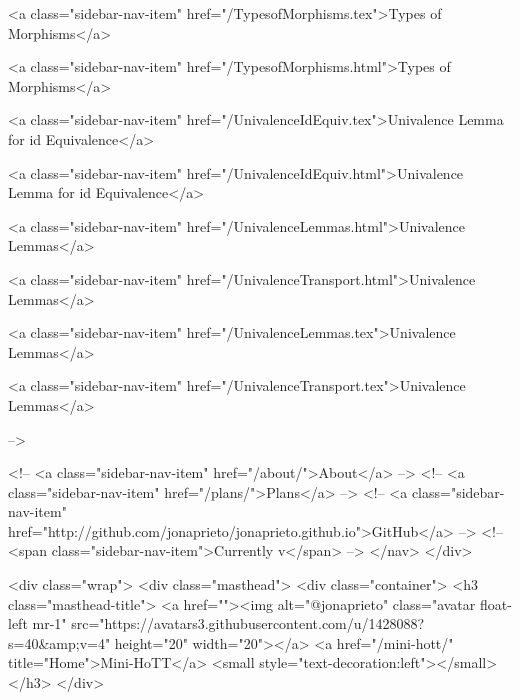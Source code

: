       
    
      
        
          <a class="sidebar-nav-item" href="/TypesofMorphisms.tex">Types of Morphisms</a>
        
      
    
      
        
          <a class="sidebar-nav-item" href="/TypesofMorphisms.html">Types of Morphisms</a>
        
      
    
      
        
          <a class="sidebar-nav-item" href="/UnivalenceIdEquiv.tex">Univalence Lemma for id Equivalence</a>
        
      
    
      
        
          <a class="sidebar-nav-item" href="/UnivalenceIdEquiv.html">Univalence Lemma for id Equivalence</a>
        
      
    
      
        
          <a class="sidebar-nav-item" href="/UnivalenceLemmas.html">Univalence Lemmas</a>
        
      
    
      
        
          <a class="sidebar-nav-item" href="/UnivalenceTransport.html">Univalence Lemmas</a>
        
      
    
      
        
          <a class="sidebar-nav-item" href="/UnivalenceLemmas.tex">Univalence Lemmas</a>
        
      
    
      
        
          <a class="sidebar-nav-item" href="/UnivalenceTransport.tex">Univalence Lemmas</a>
        
      
     -->

    <!-- <a class="sidebar-nav-item" href="/about/">About</a> -->
    <!-- <a class="sidebar-nav-item" href="/plans/">Plans</a> -->
    <!-- <a class="sidebar-nav-item" href="http://github.com/jonaprieto/jonaprieto.github.io">GitHub</a> -->
    <!-- <span class="sidebar-nav-item">Currently v</span> -->
  </nav>
</div>

    <div class="wrap">
      <div class="masthead">
        <div class="container">
          <h3 class="masthead-title">
            <a href=""><img alt="@jonaprieto" class="avatar float-left mr-1" src="https://avatars3.githubusercontent.com/u/1428088?s=40&amp;v=4" height="20" width="20"></a>
            <a href="/mini-hott/" title="Home">Mini-HoTT</a>
            <small style="text-decoration:left"></small>
          </h3>
        </div>
      
